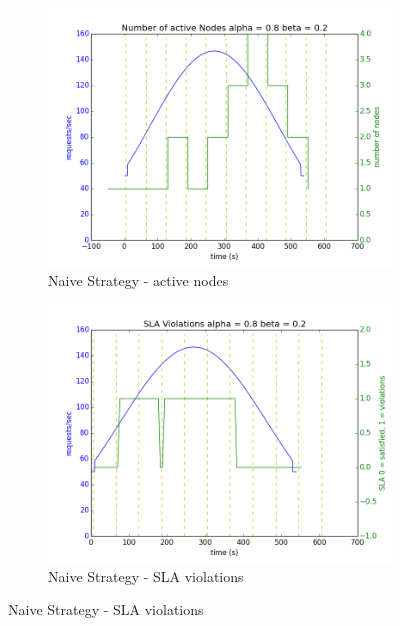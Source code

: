 \documentclass[12pt]{article}
\begin{document}
\begin{figure}[h!]
\begin{subfigure}{.5\textwidth}
\includegraphics[width=\textwidth]{Naive182nodes.png}
\caption{Naive Strategy - active nodes}
\end{subfigure}
\begin{subfigure}{.5\textwidth}
\includegraphics[width=\textwidth]{Naive182SLA.png}
\caption{Naive Strategy - SLA violations}
\end{subfigure}


\end{figure}
\end{document}
